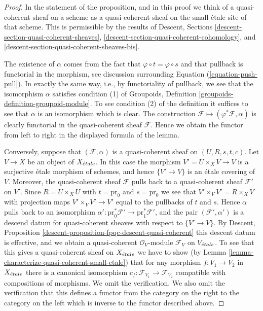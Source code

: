 \begin{proof}
In the statement of the proposition, and in this proof we think of a
quasi-coherent sheaf on a scheme as a quasi-coherent sheaf on the small
\'etale site of that scheme. This is permissible by the results of
Descent, Sections \ref{descent-section-quasi-coherent-sheaves},
\ref{descent-section-quasi-coherent-cohomology}, and
\ref{descent-section-quasi-coherent-sheaves-bis}.

\medskip\noindent
The existence of $\alpha$ comes from the fact that
$\varphi \circ t = \varphi \circ s$ and that pullback is
functorial in the morphism, see discussion surrounding
Equation (\ref{equation-push-pull}). In exactly the same way, i.e., by
functoriality of pullback, we see that the isomorphism $\alpha$ satisfies
condition (1) of
Groupoids, Definition \ref{groupoids-definition-groupoid-module}.
To see condition (2) of the definition it suffices to see that $\alpha$
is an isomorphism which is clear. The construction
$\mathcal{F} \mapsto (\varphi^*\mathcal{F}, \alpha)$
is clearly functorial in the quasi-coherent sheaf $\mathcal{F}$.
Hence we obtain the functor from left to right in the displayed
formula of the lemma.

\medskip\noindent
Conversely, suppose that $(\mathcal{F}, \alpha)$ is a quasi-coherent
sheaf on $(U, R, s, t, c)$. Let $V \to X$ be an object of $X_{\acute{e}tale}$.
In this case the morphism $V' = U \times_X V \to V$ is a surjective \'etale
morphism of schemes, and hence $\{V' \to V\}$ is an \'etale
covering of $V$. Moreover, the quasi-coherent sheaf $\mathcal{F}$
pulls back to a quasi-coherent sheaf $\mathcal{F}'$ on $V'$.
Since $R = U \times_X U$ with $t = \text{pr}_0$ and $s = \text{pr}_0$
we see that $V' \times_V V' = R \times_X V$ with projection maps
$V' \times_V V' \to V'$ equal to the pullbacks of $t$ and $s$. Hence
$\alpha$ pulls back to an isomorphism
$\alpha' : \text{pr}_0^*\mathcal{F}' \to \text{pr}_1^*\mathcal{F}'$, and
the pair $(\mathcal{F}', \alpha')$ is a descend datum for quasi-coherent
sheaves with respect to $\{V' \to V\}$. By
Descent, Proposition
\ref{descent-proposition-fpqc-descent-quasi-coherent}
this descent datum is effective, and we obtain a quasi-coherent
$\mathcal{O}_V$-module $\mathcal{F}_V$ on $V_{\acute{e}tale}$.
To see that this gives a quasi-coherent sheaf on $X_{\acute{e}tale}$ we have
to show (by
Lemma \ref{lemma-characterize-quasi-coherent-small-etale})
that for any morphism $f : V_1 \to V_2$ in $X_{\acute{e}tale}$
there is a canonical isomorphism
$c_f : \mathcal{F}_{V_1} \to \mathcal{F}_{V_2}$
compatible with compositions of morphisms. We omit the verification.
We also omit the verification that this defines a functor from the
category on the right to the category on the left which is inverse
to the functor described above.
\end{proof}

